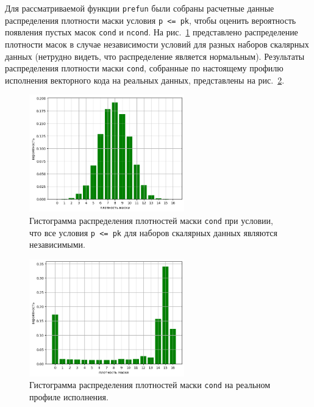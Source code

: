 Для рассматриваемой функции \texttt{prefun} были собраны расчетные данные распределения плотности маски условия \texttt{p <= pk}, чтобы оценить вероятность появления пустых масок \texttt{cond} и \texttt{ncond}.
На рис.~\ref{fig:text_4_vec_comb_mask_independent_p} представлено распределение плотности масок в случае независимости условий для разных наборов скалярных данных (нетрудно видеть, что распределение является нормальным).
Результаты распределения плотности маски \texttt{cond}, собранные по настоящему профилю исполнения векторного кода на реальных данных, представлены на рис.~\ref{fig:text_4_vec_comb_mask_real_p}.

\begin{figure}[ht]
\centering
\includegraphics[width=0.6\textwidth]{./pics/text_4_vec_comb_mask/independent_p.png}
\singlespacing
{}\caption{Гистограмма распределения плотностей маски \texttt{cond} при условии, что все условия \texttt{p <= pk} для наборов скалярных данных являются независимыми.}
\label{fig:text_4_vec_comb_mask_independent_p}
\end{figure}

\begin{figure}[h!]
\centering
\includegraphics[width=0.6\textwidth]{./pics/text_4_vec_comb_mask/real_p.png}
\singlespacing
{}\caption{Гистограмма распределения плотностей маски \texttt{cond} на реальном профиле исполнения.}
\label{fig:text_4_vec_comb_mask_real_p}
\end{figure}

